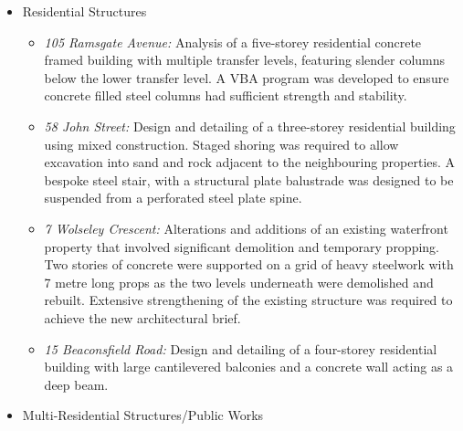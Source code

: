 \begin{cventries}
{\begin{cvitems}
\begin{itemize}
\begin{itemize}
            \item \emph{Woodford Cable Net:} Analysis of a 20 metre triangular grid of steel cables that formed a netted shade structure over a performance space. A construction sequence analysis of the cable net was performed to determine the optimal drape of the cables.
            \item \emph{Sydney Wild Life Zoo – Wild Flight:} Design of a 60 m long aerial ride, suspended by a complex array of cables from an existing arched roof structure. The existing roof spanned 40 metres with a shallow arch profile and had limited reserve capacity. A non-linear analysis was performed to confirm its adequacy and necessary strengthening measures were designed and incorporated into the new structure.
          \end{itemize}
          \item Residential Structures
          \begin{itemize}
            \item \emph{105 Ramsgate Avenue:} Analysis of a five-storey residential concrete
            framed building with multiple transfer levels, featuring slender columns below the lower transfer level. A VBA program was developed to ensure concrete filled steel columns had sufficient strength and stability.
            \item \emph{58 John Street:} Design and detailing of a three-storey residential building using mixed construction. Staged shoring was required to allow excavation into sand and rock adjacent to the neighbouring properties. A bespoke steel stair, with a structural plate balustrade was designed to be suspended from a perforated steel plate spine.
            \item \emph{7 Wolseley Crescent:} Alterations and additions of an existing waterfront property that involved significant demolition and temporary propping. Two stories of concrete were supported on a grid of heavy steelwork with 7 metre long props as the two levels underneath were demolished and rebuilt. Extensive strengthening of the existing structure was required to achieve the new architectural brief.
            \item \emph{15 Beaconsfield Road:} Design and detailing of a four-storey residential building with large cantilevered balconies and a concrete wall acting as a deep beam.
          \end{itemize}
          \item Multi-Residential Structures/Public Works
          \begin{itemize}

\end{itemize}
\end{itemize}
\end{cvitems}}
\end{cventries}
